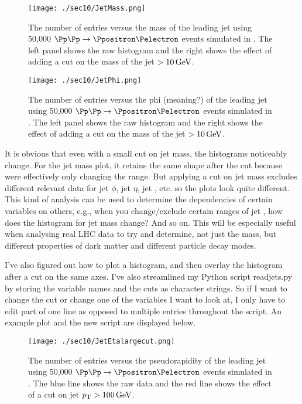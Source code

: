 \begin{figure}[H]
\centering
\texttt{[image: ./sec10/JetMass.png]}
\caption{The number of entries versus the mass of the leading jet using 50,000 $\Pp\Pp \rightarrow \Ppositron \Pelectron$ events simulated in \madgraph. The left panel shows the raw histogram and the right shows the effect of adding a cut on the mass of the jet $>10\,\text{G\text{e\kern-0.15ex V}}$.}
\end{figure}

\begin{figure}[H]
\centering
\texttt{[image: ./sec10/JetPhi.png]}
\caption{The number of entries versus the phi (meaning?) of the leading jet using 50,000 $\Pp\Pp \rightarrow \Ppositron \Pelectron$ events simulated in \madgraph. The left panel shows the raw histogram and the right shows the effect of adding a cut on the mass of the jet $>10\,\text{G\text{e\kern-0.15ex V}}$.}
\end{figure}

It is obvious that even with a small cut on jet mass, the histograms noticeably change. For the jet mass plot, it retains the same shape after the cut because were effectively only changing the range. But applying a cut on jet mass excludes different relevant data for jet $\phi$, jet $\eta$, jet \pt, etc. so the plots look quite different. This kind of analysis can be used to determine the dependencies of certain variables on others, e.g., when you change/exclude certain ranges of jet \pt, how does the histogram for jet mass change? And so on. This will be especially useful when analysing real LHC data to try and determine, not just the mass, but different properties of dark matter and different particle decay modes.

I've also figured out how to plot a histogram, and then overlay the histogram after a cut on the same axes. I've also streamlined my Python script readjets.py by storing the variable names and the cuts as character strings. So if I want to change the cut or change one of the variables I want to look at, I only have to edit part of one line as opposed to multiple entries throughout the script. An example plot and the new script are displayed below.

\begin{figure}[H]
\centering
\texttt{[image: ./sec10/JetEtalargecut.png]}
\caption{The number of entries versus the pseudorapidity of the leading jet using 50,000 $\Pp\Pp \rightarrow \Ppositron \Pelectron$ events simulated in \madgraph. The blue line shows the raw data and the red line shows the effect of a cut on jet $p_{\mathrm{T}} > 100\,\text{G\text{e\kern-0.15ex V}}$.}
\end{figure}


